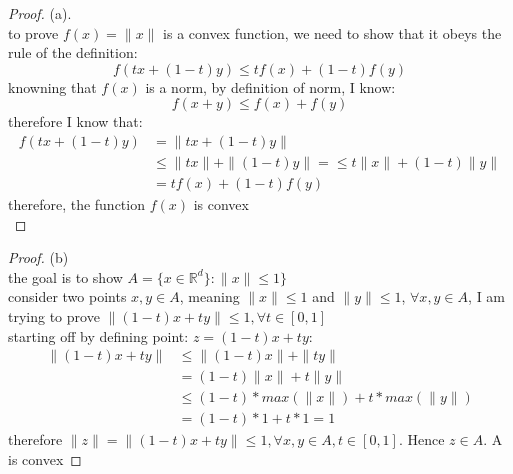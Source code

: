 \documentclass[12pt]{article}
\begin{document}
\begin{proof}
        (a).\\       
        to prove $f(x) = \|x\|$ is a convex function, we need to show that it obeys the rule of the definition: $$f(tx +(1-t)y) \leq tf(x) +(1-t)f(y)$$
        knowning that $f(x)$ is a norm, by definition of norm, I know: $$f(x+y) \leq  f(x) + f(y)$$
        therefore I know that: 
        \[
\begin{aligned}
        f(tx +(1-t)y) &= \|tx + (1-t)y\| \\
                      &\leq \|tx\| + \|(1-t)y\| = \leq t\|x\| + (1-t)\|y\| \\
                      &=tf(x) +(1-t)f(y)
\end{aligned}
        \]
        therefore, the function $f(x)$ is convex\\
\end{proof}


\begin{proof}
(b)\\
the goal is to show $A= \{x \in \mathbb{R}^d\}: \|x\| \leq 1\}$\\
consider two points $x,y \in A$, meaning $\|x\| \leq  1$ and 
$\|y\| \leq 1$, $\forall x,y \in A$, I am trying to prove $\|(1-t)x +ty \| \leq  1, \forall t \in [0,1]$ \\

\noindent starting off by defining point: $z =(1-t)x + ty  $:\\
\[
\begin{aligned}
        \|(1-t)x + ty \| &\leq  \|(1-t)x\| + \|ty \| \\
                         &= (1-t) \|x\| + t \|y\| \\
                         &  \leq (1-t) *max(\|x\|) + t *max(\|y\|)\\
                         &= (1-t) * 1 + t *1 = 1
\end{aligned}
\]
therefore $\|z\|=  \|(1-t)x + ty \|  \leq 1, \forall x,y \in A, t \in[0,1]$. Hence $z \in A$. A is convex
\end{proof}
\end{document}
